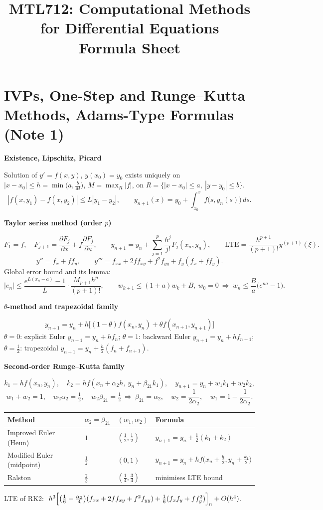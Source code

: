 \documentclass[10pt,a4paper]{article}
\title{\textbf{MTL712: Computational Methods for Differential Equations}\\[4pt]
\large Formula Sheet}
\author{}
\date{}
\newcommand{\pd}[2]{\frac{\partial #1}{\partial #2}}
\newcommand{\head}[1]{\par\smallskip\noindent\textbf{\color{blue!50!black}#1}\par\nobreak}
\begin{document}
\maketitle
\vspace{-3em}
\thispagestyle{plain}
{\small\tableofcontents}

\section{IVPs, One-Step and Runge--Kutta Methods, Adams-Type Formulas (Note 1)}

\head{Existence, Lipschitz, Picard}
Solution of \(y'=f(x,y)\), \(y(x_0)=y_0\) exists uniquely on
\(|x-x_0|\le h=\min\bigl(a,\tfrac bM\bigr)\), \(M=\max_R|f|\), on
\(R=\{|x-x_0|\le a,\ |y-y_0|\le b\}\).
\[
  |f(x,y_1)-f(x,y_2)|\le L|y_1-y_2|,
  \qquad
  y_{n+1}(x)=y_0+\int_{x_0}^x f\bigl(s,y_n(s)\bigr)\,ds .
\]

\head{Taylor series method (order \(p\))}
\[
  F_1=f,\quad F_{j+1}=\pd{F_j}{x}+f\pd{F_j}{u},
  \qquad
  y_{n+1}=y_n+\sum_{j=1}^p\frac{h^j}{j!}F_j(x_n,y_n),
  \qquad
  \text{LTE}=\frac{h^{p+1}}{(p+1)!}y^{(p+1)}(\xi).
\]
\[
  y''=f_x+ff_y,\qquad
  y'''=f_{xx}+2ff_{xy}+f^2f_{yy}+f_y(f_x+ff_y).
\]
Global error bound and its lemma:
\[
  |e_n|\le\frac{e^{L(x_n-a)}-1}{L}\cdot\frac{M_{p+1}h^p}{(p+1)!},
  \qquad
  w_{k+1}\le(1+a)w_k+B,\ w_0=0\ \Rightarrow\ w_n\le\frac Ba\bigl(e^{na}-1\bigr).
\]

\head{\(\theta\)-method and trapezoidal family}
\[
  y_{n+1}=y_n+h\bigl[(1-\theta)f(x_n,y_n)+\theta f(x_{n+1},y_{n+1})\bigr]
\]
\(\theta=0\): explicit Euler \(y_{n+1}=y_n+hf_n\);
\(\theta=1\): backward Euler \(y_{n+1}=y_n+hf_{n+1}\);
\(\theta=\frac12\): trapezoidal \(y_{n+1}=y_n+\frac h2(f_n+f_{n+1})\).

\head{Second-order Runge--Kutta family}
\[
  k_1=hf(x_n,y_n),\quad k_2=hf(x_n+\alpha_2h,\ y_n+\beta_{21}k_1),\quad
  y_{n+1}=y_n+w_1k_1+w_2k_2,
\]
\[
  w_1+w_2=1,\quad w_2\alpha_2=\tfrac12,\quad w_2\beta_{21}=\tfrac12
  \ \Longrightarrow\
  \beta_{21}=\alpha_2,\quad w_2=\frac1{2\alpha_2},\quad w_1=1-\frac1{2\alpha_2}.
\]
\begin{center}
\renewcommand{\arraystretch}{1.25}
\begin{tabular}{@{}llll@{}}
\toprule
Method & \(\alpha_2=\beta_{21}\) & \((w_1,w_2)\) & Formula\\
\midrule
Improved Euler (Heun) & \(1\) & \((\frac12,\frac12)\) & \(y_{n+1}=y_n+\frac12(k_1+k_2)\)\\
Modified Euler (midpoint) & \(\frac12\) & \((0,1)\) & \(y_{n+1}=y_n+hf\bigl(x_n+\frac h2,y_n+\frac{k_1}2\bigr)\)\\
Ralston & \(\frac23\) & \((\frac14,\frac34)\) & minimises LTE bound\\
\bottomrule
\end{tabular}
\end{center}
LTE of RK2:
\(\;h^3\Bigl[\bigl(\tfrac16-\tfrac{\alpha_2}4\bigr)(f_{xx}+2ff_{xy}+f^2f_{yy})
+\tfrac16(f_xf_y+ff_y^2)\Bigr]_n+O(h^4)\).
\end{document}
